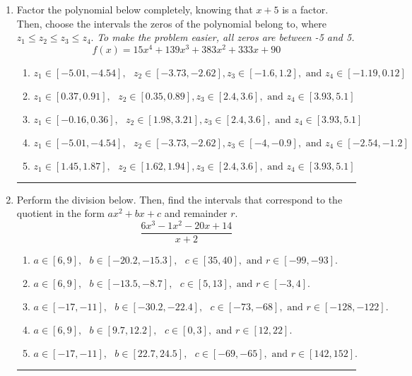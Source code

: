 \documentclass[14pt]{extbook}
\newcommand{\litem}[1]{\item#1\hspace*{-1cm}\rule{\textwidth}{0.4pt}}
\begin{document}
\begin{enumerate}
\litem{
Factor the polynomial below completely, knowing that $x + 5$ is a factor. Then, choose the intervals the zeros of the polynomial belong to, where $z_1 \leq z_2 \leq z_3 \leq z_4$. \textit{To make the problem easier, all zeros are between -5 and 5.}\[ f(x) = 15x^{4} +139 x^{3} +383 x^{2} +333 x + 90 \]\begin{enumerate}[label=\Alph*.]
\item \( z_1 \in [-5.01, -4.54], \text{   }  z_2 \in [-3.73, -2.62], z_3 \in [-1.6, 1.2], \text{   and   } z_4 \in [-1.19, 0.12] \)
\item \( z_1 \in [0.37, 0.91], \text{   }  z_2 \in [0.35, 0.89], z_3 \in [2.4, 3.6], \text{   and   } z_4 \in [3.93, 5.1] \)
\item \( z_1 \in [-0.16, 0.36], \text{   }  z_2 \in [1.98, 3.21], z_3 \in [2.4, 3.6], \text{   and   } z_4 \in [3.93, 5.1] \)
\item \( z_1 \in [-5.01, -4.54], \text{   }  z_2 \in [-3.73, -2.62], z_3 \in [-4, -0.9], \text{   and   } z_4 \in [-2.54, -1.2] \)
\item \( z_1 \in [1.45, 1.87], \text{   }  z_2 \in [1.62, 1.94], z_3 \in [2.4, 3.6], \text{   and   } z_4 \in [3.93, 5.1] \)

\end{enumerate} }
\litem{
Perform the division below. Then, find the intervals that correspond to the quotient in the form $ax^2+bx+c$ and remainder $r$.\[ \frac{6x^{3} -1 x^{2} -20 x + 14}{x + 2} \]\begin{enumerate}[label=\Alph*.]
\item \( a \in [6, 9], \text{   } b \in [-20.2, -15.3], \text{   } c \in [35, 40], \text{   and   } r \in [-99, -93]. \)
\item \( a \in [6, 9], \text{   } b \in [-13.5, -8.7], \text{   } c \in [5, 13], \text{   and   } r \in [-3, 4]. \)
\item \( a \in [-17, -11], \text{   } b \in [-30.2, -22.4], \text{   } c \in [-73, -68], \text{   and   } r \in [-128, -122]. \)
\item \( a \in [6, 9], \text{   } b \in [9.7, 12.2], \text{   } c \in [0, 3], \text{   and   } r \in [12, 22]. \)
\item \( a \in [-17, -11], \text{   } b \in [22.7, 24.5], \text{   } c \in [-69, -65], \text{   and   } r \in [142, 152]. \)


\end{enumerate}}
\end{enumerate}
\end{document}
